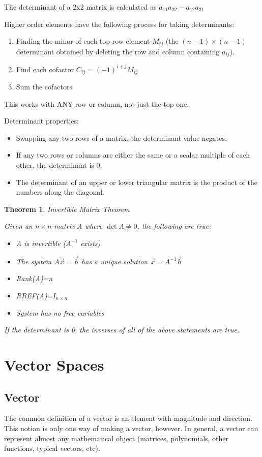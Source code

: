 \documentclass{article}
\newtheorem{theorem}{Theorem}
\begin{document}
The determinant of a 2x2 matrix is calculated as $a_{11}a_{22}-a_{12}a_{21}$

Higher order elements have the following process for taking determinants:
\begin{enumerate}
	\item Finding the minor of each top row element $M_{ij}$
		(the $(n-1)\times(n-1)$ determinant obtained by deleting the 
		row and column containing $a_{ij}$). 
	\item Find each cofactor $C_{ij}=(-1)^{i+j}M_{ij}$ 
	\item Sum the cofactors
\end{enumerate}
This works with ANY row or column, not just the top one.

Determinant properties:
\begin{itemize}
	\item Swapping any two rows of a matrix, the determinant value negates.
	\item If any two rows or columns are either the same or a scalar 
		multiple of each other, the determinant is 0.
	\item The determinant of an upper or lower triangular matrix is
		the product of the numbers along the diagonal.
\end{itemize}

\begin{theorem}Invertible Matrix Theorem

	Given an $n\times n$ matrix A where $\det{A}\neq0$, the following are 
	true:
	\begin{itemize}
		\item A is invertible ($A^{-1}$ exists)
		\item The system $A\vec{x}=\vec{b}$ has a unique solution 
			$\vec{x}=A^{-1}\vec{b}$
		\item Rank(A)=n
		\item RREF(A)=$I_{n\times n}$
		\item System has no free variables
	\end{itemize}
	If the determinant is 0, the inverses of all of the above statements
	are true.
\end{theorem}

\section{Vector Spaces}
\subsection{Vector}
The common definition of a vector is an element with magnitude and direction. 
This notion is only one way of making a vector, however. In general, a vector
can represent almost any mathematical object (matrices, polynomials, other 
functions, typical vectors, etc).
\end{document}
